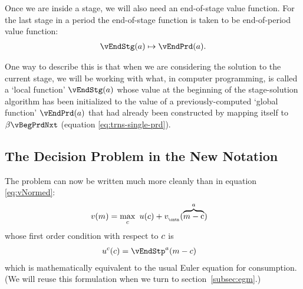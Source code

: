 Once we are inside a {stage}, we will also need an end-of-{stage} value function.  For the last {stage} in a {period} the end-of-{stage} function is taken to be end-of-{period} value function:
  \begin{equation}\begin{gathered}\begin{aligned}
        \vEndStg(\aNrm) \mapsto \vEndPrd(\aNrm).
      \end{aligned}\end{gathered}\end{equation}

One way to describe this is that when we are considering the solution to the current {stage}, we will be working with what, in computer programming, is called a `local function' $\vEndStg(a)$ whose value at the beginning of the {stage}-solution algorithm has been initialized to the value of a previously-computed `global function' $\vEndPrd(a)$ that had already been constructed by mapping itself to $\DiscFac \vBegPrdNxt$ (equation \eqref{eq:trns-single-prd}).
\hypertarget{decision-problem}{}

\subsection{The Decision Problem in the New Notation}\label{subsec:decision-problem}

The {\Decision} problem can now be written much more cleanly than in equation \eqref{eq:vNormed}:
  \begin{equation}\begin{gathered}\begin{aligned}
        \vFunc(\mNrm) & = \max_{\cNrm}~ \uFunc({\cNrm}) + \vFunc_{_\cntn}(\overbrace{\mNrm-\cFunc}^{\aNrm}) \label{eq:vMid}
      \end{aligned}\end{gathered}\end{equation}
whose first order condition with respect to $c$ is
\begin{equation}\begin{gathered}\begin{aligned}
  \uFunc^{\cNrm}(\cNrm) &= \vEndStp^{\aNrm}(\mNrm-\cNrm)  \label{eq:upEqbetaOp} 
\end{aligned}\end{gathered}\end{equation}
which is mathematically equivalent to the usual Euler equation for consumption.  (We will reuse this formulation when we turn to section~\ref{subsec:egm}.)

